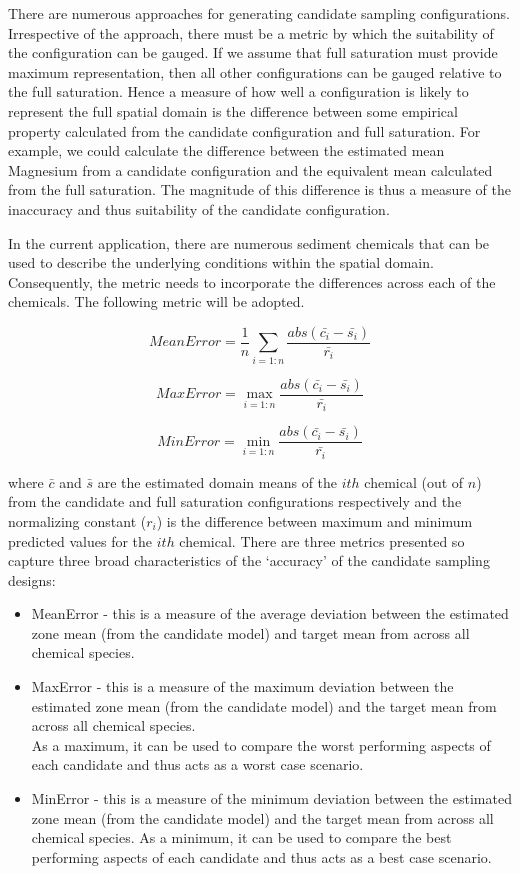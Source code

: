 \documentclass[a4paper]{article}
\begin{document}
There are numerous approaches for generating candidate sampling
configurations. Irrespective of the approach, there must be a metric by
which the suitability of the configuration can be gauged. If we assume
that full saturation must provide maximum representation, then all other
configurations can be gauged relative to the full saturation. Hence a
measure of how well a configuration is likely to represent the full
spatial domain is the difference between some empirical property
calculated from the candidate configuration and full saturation. For
example, we could calculate the difference between the estimated mean
Magnesium from a candidate configuration and the equivalent mean
calculated from the full saturation. The magnitude of this difference is
thus a measure of the inaccuracy and thus suitability of the candidate
configuration.

In the current application, there are numerous sediment chemicals that
can be used to describe the underlying conditions within the spatial
domain. Consequently, the metric needs to incorporate the differences
across each of the chemicals. The following metric will be adopted.

\[
Mean Error = \frac{1}{n} \sum_{i=1:n}{\frac{abs(\bar{c_i} - \bar{s_i})}{\bar{r_i}}}
\]

\[
Max Error = \max_{i=1:n}{\frac{abs(\bar{c_i} - \bar{s_i})}{\bar{r_i}}}
\]

\[
Min Error = \min_{i=1:n}{\frac{abs(\bar{c_i} - \bar{s_i})}{\bar{r_i}}}
\]

where \(\bar{c}\) and \(\bar{s}\) are the estimated domain means of the
\(ith\) chemical (out of \(n\)) from the candidate and full saturation
configurations respectively and the normalizing constant (\(r_i\)) is
the difference between maximum and minimum predicted values for the
\(ith\) chemical. There are three metrics presented so capture three
broad characteristics of the `accuracy' of the candidate sampling
designs:

\begin{itemize}
\tightlist
\item
  MeanError - this is a measure of the average deviation between the
  estimated zone mean (from the candidate model) and target mean from
  across all chemical species.
\item
  MaxError - this is a measure of the maximum deviation between the
  estimated zone mean (from the candidate model) and the target mean
  from across all chemical species.\\
  As a maximum, it can be used to compare the worst performing aspects
  of each candidate and thus acts as a worst case scenario.
\item
  MinError - this is a measure of the minimum deviation between the
  estimated zone mean (from the candidate model) and the target mean
  from across all chemical species. As a minimum, it can be used to
  compare the best performing aspects of each candidate and thus acts as
  a best case scenario.
\end{itemize}
\end{document}
